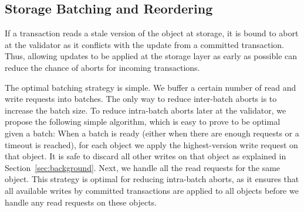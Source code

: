 \subsection{Storage Batching and Reordering}
If a transaction reads a stale version of the object at storage, it is bound to abort at the validator as it conflicts with the update from a committed transaction. Thus, allowing updates to be applied at the storage layer as early as possible can reduce the chance of aborts for incoming transactions.

The optimal batching strategy is simple. We buffer a certain number of read and write requests into batches. The only way to reduce inter-batch aborts is to increase the batch size. To reduce intra-batch aborts later at the validator, we propose the following simple algorithm, which is easy to prove to be optimal given a batch:  When a batch is ready (either when there are enough requests or a timeout is reached), for each object we apply the highest-version write request on that object. It is safe to discard all other writes on that object as explained in Section~\ref{sec:background}. Next, we handle all the read requests for the same object. This strategy is optimal for reducing intra-batch aborts, as it ensures that all available writes by committed transactions are applied to all objects before we handle any read requests on these objects. 



